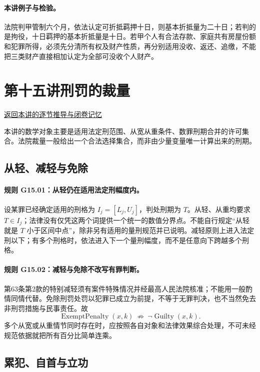 \paragraph{本讲例子与检验。}
法院判甲管制六个月，依法认定可折抵羁押十日，则基本折抵量为二十日；若判的是拘役，十日羁押的基本折抵量是十日。若甲个人有合法存款、家庭共有房屋份额和犯罪所得，必须先分清所有权及财产性质，再分别适用没收、返还、追缴，不能把三类财产直接相加认定为全部可没收个人财产。

\section{第十五讲\quad 刑罚的裁量}

\label{ref:lecture:15}

\noindent\hyperref[lecture:15]{返回本讲的逐节推导与闭卷记忆}

本讲的数学对象主要是适用法定刑范围、从宽从重条件、数罪刑期合并的许可集合。法院裁量一般给出一个合法选择集合，而非由少量变量唯一计算出来的刑期。

\subsection{从轻、减轻与免除}
\paragraph{规则 G15.01：从轻仍在适用法定刑幅度内。}
设某罪已经确定适用的刑格为 $I_j=[L_j,U_j]$，判处刑期为 $T$。从轻、从重均要求 $T\in I_j$；法律没有仅凭这两个词提供一个统一的数值分界点。不能自行规定“从轻就是 $T$ 小于区间中点”，除非另有适用的量刑规范并已说明。减轻原则上进入法定刑以下；有多个刑格时，依法进入下一个量刑幅度，而不是任意向下跨越多个刑格。

\paragraph{规则 G15.02：减轻与免除不改写有罪判断。}
第63条第2款的特别减轻须有案件特殊情况并经最高人民法院核准；不能用一般酌情同情代替。免除刑罚处罚以犯罪已成立为前提，不等于无罪判决，也不当然免去非刑罚措施与民事责任。故
\[
\operatorname{ExemptPenalty}(x,k)\ \not\Longrightarrow\
\neg\operatorname{Guilty}(x,k).
\]
多个从宽或从重情节同时存在时，应按照各自对象和法律效果综合处理，不可未经规范依据就把所有百分比简单连乘。

\subsection{累犯、自首与立功}
